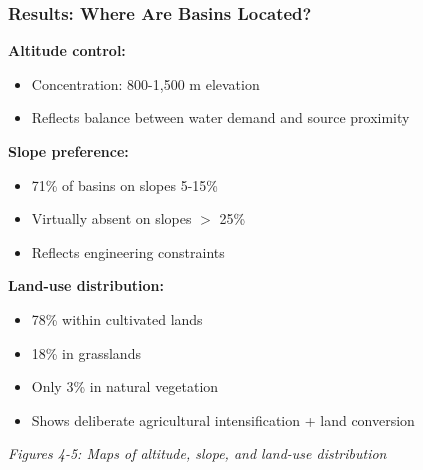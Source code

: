 \documentclass{beamer}
\begin{document}
\begin{frame}
\frametitle{Results: Where Are Basins Located?}

\textbf{Altitude control:}
\begin{itemize}
  \item Concentration: 800-1,500 m elevation
  \item Reflects balance between water demand and source proximity
\end{itemize}

\textbf{Slope preference:}
\begin{itemize}
  \item 71\% of basins on slopes 5-15\%
  \item Virtually absent on slopes $>$ 25\%
  \item Reflects engineering constraints
\end{itemize}

\textbf{Land-use distribution:}
\begin{itemize}
  \item 78\% within cultivated lands
  \item 18\% in grasslands
  \item Only 3\% in natural vegetation
  \item Shows deliberate agricultural intensification + land conversion
\end{itemize}

\begin{center}
  \small{\textit{Figures 4-5: Maps of altitude, slope, and land-use distribution}}
\end{center}
\end{frame}
\end{document}
